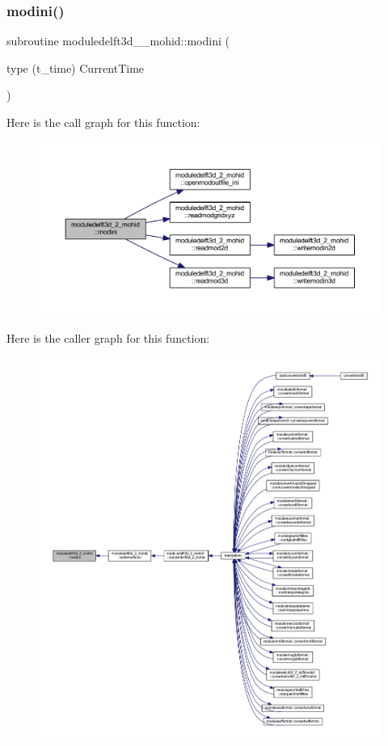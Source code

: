 \subsubsection{\texorpdfstring{modini()}{modini()}}
{\footnotesize\ttfamily subroutine moduledelft3d\+\_\+\_\+mohid\+::modini (\begin{DoxyParamCaption}\item[{type (t\+\_\+time)}]{Current\+Time }\end{DoxyParamCaption})\hspace{0.3cm}{\ttfamily [private]}}

Here is the call graph for this function\+:\nopagebreak
\begin{figure}[H]
\begin{center}
\leavevmode
\includegraphics[width=350pt]{namespacemoduledelft3d__2__mohid_ad00b6a867c663519cfa8ad6f6d2b3532_cgraph}
\end{center}
\end{figure}
Here is the caller graph for this function\+:\nopagebreak
\begin{figure}[H]
\begin{center}
\leavevmode
\includegraphics[width=350pt]{namespacemoduledelft3d__2__mohid_ad00b6a867c663519cfa8ad6f6d2b3532_icgraph}
\end{center}
\end{figure}
